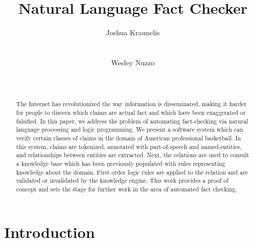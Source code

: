 \documentclass{chi2009}
\begin{document}
\setlength{\paperheight}{11in}
\setlength{\paperwidth}{8.5in}
\setlength{\pdfpageheight}{\paperheight}
\setlength{\pdfpagewidth}{\paperwidth}


\title{Natural Language Fact Checker}
\author{
  \alignauthor Joshua Kraunelis\\
    \\
    \\
  \alignauthor Wesley Nuzzo\\
    \\
    \\
}

\maketitle

\begin{abstract}
The Internet has revolutionized the way information is disseminated, making it harder for people to discern which claims are actual fact and which have been exaggerated or falsified.  In this paper, we address the problem of automating fact-checking via natural language processing and logic programming.  We present a software system which can verify certain classes of claims in the domain of American professional basketball.  In this system, claims are tokenized, annotated with part-of-speech and named-entities, and relationships between entities are extracted.  Next, the relations are used to consult a knowledge base which has been previously populated with rules representing knowledge about the domain. First order logic rules are applied to the relation and are validated or invalidated by the knowledge engine.  This work provides a proof of concept and sets the stage for further work in the area of automated fact checking.
\end{abstract}


\section{Introduction}
\end{document}
